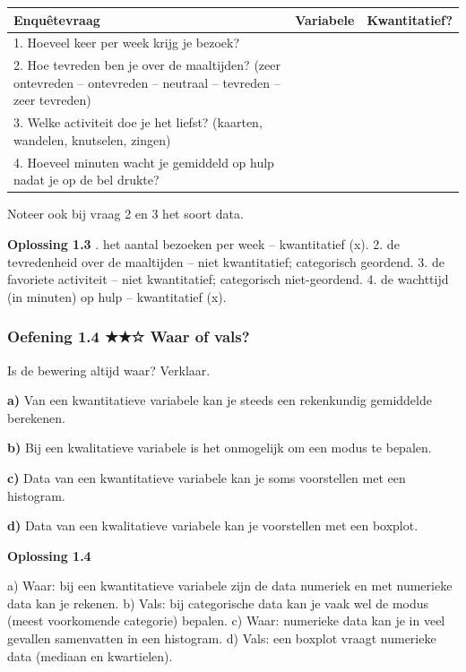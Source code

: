 \begin{tabular}{lll}
\hline
Enquêtevraag & Variabele & Kwantitatief? \\
\hline
1. Hoeveel keer per week krijg je bezoek? & & \\
2. Hoe tevreden ben je over de maaltijden? (zeer ontevreden – ontevreden – neutraal – tevreden – zeer tevreden) & & \\
3. Welke activiteit doe je het liefst? (kaarten, wandelen, knutselen, zingen) & & \\
4. Hoeveel minuten wacht je gemiddeld op hulp nadat je op de bel drukte? & & \\
\hline
\end{tabular}

Noteer ook bij vraag 2 en 3 het soort data. \lijn

\begin{oplossing}
\textbf{Oplossing 1.3} . het aantal bezoeken per week – kwantitatief (x). 2. de tevredenheid over de maaltijden – niet kwantitatief; categorisch geordend. 3. de favoriete activiteit – niet kwantitatief; categorisch niet-geordend. 4. de wachttijd (in minuten) op hulp – kwantitatief (x).
\end{oplossing}

\subsubsection*{Oefening 1.4 \quad ★★☆ \quad Waar of vals?}

Is de bewering altijd waar? Verklaar.

\textbf{a)} Van een kwantitatieve variabele kan je steeds een rekenkundig gemiddelde berekenen. \lijn

\textbf{b)} Bij een kwalitatieve variabele is het onmogelijk om een modus te bepalen. \lijn

\textbf{c)} Data van een kwantitatieve variabele kan je soms voorstellen met een histogram. \lijn

\textbf{d)} Data van een kwalitatieve variabele kan je voorstellen met een boxplot. \lijn

\begin{oplossing}
\textbf{Oplossing 1.4}

a) Waar: bij een kwantitatieve variabele zijn de data numeriek en met numerieke data kan je rekenen. b) Vals: bij categorische data kan je vaak wel de modus (meest voorkomende categorie) bepalen. c) Waar: numerieke data kan je in veel gevallen samenvatten in een histogram. d) Vals: een boxplot vraagt numerieke data (mediaan en kwartielen).
\end{oplossing}

